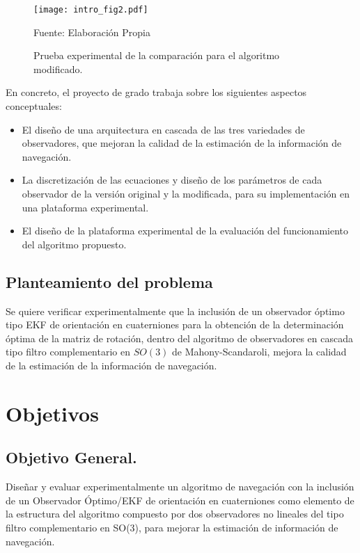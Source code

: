 \documentclass[10pt]{report}
\numberwithin{equation}{chapter}
\numberwithin{algorithm}{chapter}
\begin{document}
\begin{figure}[t]
\begin{center}
\texttt{[image: intro\_fig2.pdf]}
\caption{Prueba experimental de la comparación para el algoritmo modificado.}
\scriptsize{Fuente: Elaboración Propia}
\label{intro_fig1}
\end{center}
\end{figure}
En concreto, el proyecto de grado trabaja sobre los siguientes aspectos conceptuales: 
\begin{itemize}
\item El diseño de una arquitectura en cascada de las tres variedades de observadores, que mejoran la calidad de la estimación de la información de navegación.
\item La discretización de las ecuaciones y diseño de los parámetros de cada observador de la versión original y la modificada, para su implementación en una plataforma experimental.
\item El diseño de la plataforma experimental de la evaluación del funcionamiento del algoritmo propuesto.\end{itemize}
\subsection{Planteamiento del problema}
Se quiere verificar experimentalmente que la inclusión de un observador óptimo tipo EKF de orientación en cuaterniones para la obtención de la determinación óptima de la matriz de rotación, dentro del algoritmo de observadores en cascada tipo filtro complementario en $SO(3)$ de Mahony-Scandaroli, mejora la calidad de la estimación de la información de navegación.
\section{Objetivos}
\subsection{Objetivo General.}
Diseñar y evaluar experimentalmente un algoritmo de navegación con la inclusión de un Observador Óptimo/EKF de orientación en cuaterniones como elemento de la estructura del algoritmo compuesto por dos observadores no lineales del tipo filtro complementario en SO(3), para mejorar la estimación de información de navegación.\par
\end{document}
